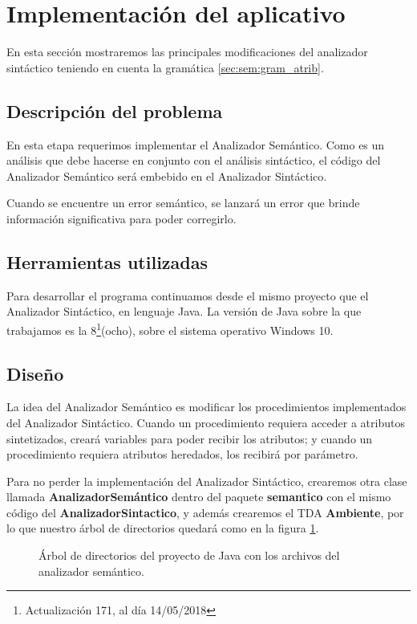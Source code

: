 \section{Implementación del aplicativo}
En esta sección mostraremos las principales modificaciones del analizador sintáctico teniendo en cuenta la gramática \ref{sec:sem:gram_atrib}. 

\subsection{Descripción del problema}
En esta etapa requerimos implementar el Analizador Semántico. Como es un análisis que debe hacerse en conjunto con el análisis sintáctico, el código del Analizador Semántico será embebido en el Analizador Sintáctico.

Cuando se encuentre un error semántico, se lanzará un error que brinde información significativa para poder corregirlo. 

\subsection{Herramientas utilizadas}
Para desarrollar el programa continuamos desde el mismo proyecto que el Analizador Sintáctico, en lenguaje Java. La versión de Java sobre la que trabajamos es la 8\footnote{Actualización 171, al día 14/05/2018}(ocho), sobre el sistema operativo Windows 10. 

\subsection{Diseño}
La idea del Analizador Semántico es modificar los procedimientos implementados del Analizador Sintáctico. Cuando un procedimiento requiera acceder a atributos sintetizados, creará variables para poder recibir los atributos; y cuando un procedimiento requiera atributos heredados, los recibirá por parámetro. 

Para no perder la implementación del Analizador Sintáctico, crearemos otra clase llamada \textbf{AnalizadorSemántico} dentro del paquete \textbf{semantico} con el mismo código del \textbf{AnalizadorSintactico}, y además crearemos el TDA \textbf{Ambiente}, por lo que nuestro árbol de directorios quedará como en la figura \ref{fig:arbol_dir_4}.

\begin{figure}[H]
\caption{Árbol de directorios del proyecto de Java con los archivos del analizador semántico.}
\label{fig:arbol_dir_4}
\end{figure}

